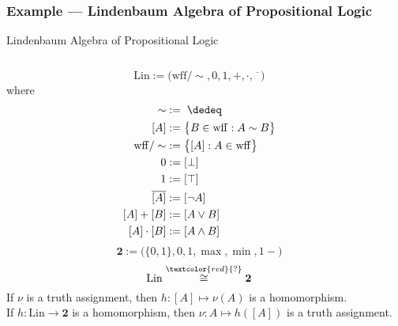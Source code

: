 \documentclass[UTF8,aspectratio=43,11pt,colorlinks,compress,openany]{beamer}%
\begin{document}
\begin{frame}\frametitle{Example --- Lindenbaum Algebra of Propositional Logic}
\setlength\abovedisplayskip{0pt}
\setlength\belowdisplayskip{0pt}
	\begin{block}{Lindenbaum Algebra of Propositional Logic}
	\begin{columns}
		\[\mathrm{Lin}:=\Big(\mathrm{wff}/\sim,0,1,+,\cdot,\overline{\phantom{x}}\Big)\]
		where 
		\begin{align*}
		\sim&:=\;\dedeq\\
		[A]&:=\big\{B\in\mathrm{wff}: A\sim B\big\}\\
		\mathrm{wff}/\sim&:=\big\{[A]: A\in\mathrm{wff}\big\}\\
		0&:=[\bot]\\
		1&:=[\top]\\
		\overline{[A]}&:=[\neg A]\\
		[A]+[B]&:=[A\vee B]\\
		[A]\cdot[B]&:=[A\wedge B]
		\end{align*}
		\[\mathbf{2}:=\Big(\{0,1\},0,1,\max,\min,1-\Big)\]
		\[\mathrm{Lin}\stackrel{\textcolor{red}{?}}{\cong}\mathbf{2}\]
		If $\nu$ is a truth assignment, then $h: [A]\mapsto\nu(A)$ is a homomorphism.\\
		If $h:\mathrm{Lin}\to\mathbf{2}$ is a homomorphism, then $\nu: A\mapsto h([A])$ is a truth assignment.
	\end{columns}
	\end{block}
\end{frame}
\end{document}
